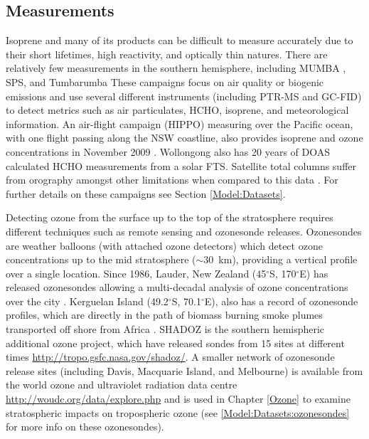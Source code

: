   
  \subsection{Measurements}
    
    Isoprene and many of its products can be difficult to measure accurately due to their short lifetimes, high reactivity, and optically thin natures.
    There are relatively few measurements in the southern hemisphere, including MUMBA \parencite{PatonWalsh2013}, SPS\parencite{Dunne2018}, and Tumbarumba \parencite{Emmerson2016}
    These campaigns focus on air quality or biogenic emissions and use several different instruments (including PTR-MS and GC-FID) to detect metrics such as air particulates, HCHO, isoprene, and meteorological information.
    An air-flight campaign (HIPPO) measuring over the Pacific ocean, with one flight passing along the NSW coastline, also provides isoprene and ozone concentrations in November 2009 \parencite{Wolfsy2011}.
    Wollongong also has 20 years of DOAS calculated HCHO measurements from a solar FTS. 
    Satellite total columns suffer from orography amongst other limitations when compared to this data \parencite{Demol2010}.
    For further details on these campaigns see Section \ref{Model:Datasets}.
    
    Detecting ozone from the surface up to the top of the stratosphere requires different techniques such as remote sensing and ozonesonde releases.
    Ozonesondes are weather balloons (with attached ozone detectors) which detect ozone concentrations up to the mid stratosphere ($\sim 30$~km), providing a vertical profile over a single location.
    Since 1986, Lauder, New Zealand (45$^{\circ}$S, 170$^{\circ}$E) has released ozonesondes allowing a multi-decadal analysis of ozone concentrations over the city \parencite{Brinksma2002}.
    Kerguelan Island (49.2$^{\circ}$S, 70.1$^{\circ}$E), also has a record of ozonesonde profiles, which are directly in the path of biomass burning smoke plumes transported off shore from Africa \parencite{Baray2012}.
    SHADOZ is the southern hemispheric additional ozone project, which have released sondes from 15 sites at different times \url{http://tropo.gsfc.nasa.gov/shadoz/}.
    A smaller network of ozonesonde release sites (including Davis, Macquarie Island, and Melbourne) is available from the world ozone and ultraviolet radiation data centre \url{http://woudc.org/data/explore.php} and is used in Chapter \ref{Ozone} to examine stratospheric impacts on tropospheric ozone (see \ref{Model:Datasets:ozonesondes} for more info on these ozonesondes).
  
